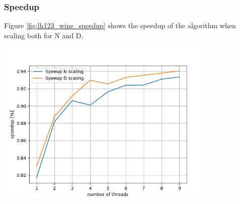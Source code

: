 \documentclass{report}
\begin{document}
\begin{minipage}[b]{0.48\textwidth}
  \subsubsection*{Speedup}
  Figure \ref{fig:lh123_wine_speedup} shows the speedup of the algorithm when scaling both for N and D.
  \begin{center} 
    \includegraphics[width = 0.8\textwidth]{imgs/lh123_wine_speedup.png}
    \label{fig:lh123_wine_speedup}
  \end{center}
\end{minipage}
\hspace{0.1in}
\end{document}
